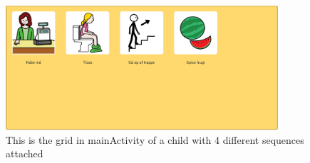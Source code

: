 \begin{figure} [h!]
\centering
\includegraphics[width=0.9\textwidth]{Pics/Sprint2/dialogs/magicGrid.png}
\caption{This is the grid in mainActivity of a child with 4 different sequences attached}
\label{fig:GGridView}
\end{figure}





